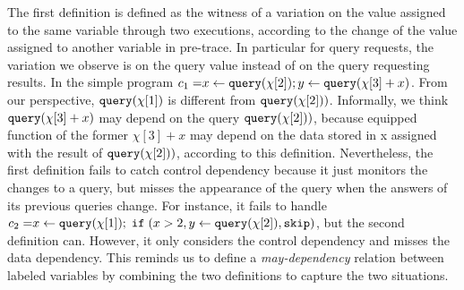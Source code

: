 {   
The first definition is defined as
the witness of a variation on the value assigned to the same variable through two executions,
according to the change of the value assigned to another variable in pre-trace.
In particular for query requests, the variation we observe is on the query value instead of on the query requesting results.
In 
the simple program $c_1 =\mathrel{ x \leftarrow {\tt query}(\chi[2]) } ;\mathrel{ y \leftarrow {\tt query}(\chi[3] + x) }$.
 From our perspective, ${\tt query}(\chi[1])$ is different from ${\tt query}(\chi[2]))$. Informally, we think ${\tt query}(\chi[3] + x)$ may depend on the query ${\tt query}(\chi[2]))$, because equipped function of the former $\chi[3] + x$ may depend on the data stored in x assigned with the result of ${\tt query}(\chi[2]))$, according to this definition. }
%
Nevertheless, the first definition fails to catch control dependency because it just monitors the changes to a query, but misses the appearance of the query when the answers of its previous queries change. 
For instance, it fails to handle $
      c_2 = \mathrel{ x \leftarrow {\tt query}(\chi[1]) } ; \;\mathtt{if}\;( x > 2 , \mathrel{ y \leftarrow {\tt query}(\chi[2]) }, \mathtt{skip} )
   $, but the second definition can. However, it only considers the control dependency and misses the data dependency. This reminds us to define a \emph{may-dependency} relation between labeled variables by combining the two definitions to capture the two situations.
%
%
%
%
